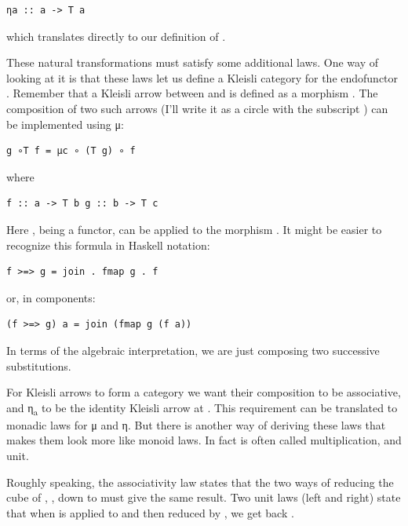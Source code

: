 \begin{verbatim}
ηa :: a -> T a
\end{verbatim}

which translates directly to our definition of .

These natural transformations must satisfy some additional laws. One way
of looking at it is that these laws let us define a Kleisli category for
the endofunctor . Remember that a Kleisli arrow between
 and  is defined as a morphism
. The composition of two such arrows
(I'll write it as a circle with the subscript ) can be
implemented using μ:

\begin{verbatim}
g ∘T f = μc ∘ (T g) ∘ f
\end{verbatim}

where

\begin{verbatim}
f :: a -> T b g :: b -> T c
\end{verbatim}

Here , being a functor, can be applied to the morphism
. It might be easier to recognize this formula in Haskell
notation:

\begin{verbatim}
f >=> g = join . fmap g . f
\end{verbatim}

or, in components:

\begin{verbatim}
(f >=> g) a = join (fmap g (f a))
\end{verbatim}

In terms of the algebraic interpretation, we are just composing two
successive substitutions.

For Kleisli arrows to form a category we want their composition to be
associative, and η\textsubscript{a} to be the identity Kleisli arrow at
. This requirement can be translated to monadic laws for μ and
η. But there is another way of deriving these laws that makes them look
more like monoid laws. In fact  is often called
multiplication, and  unit.

Roughly speaking, the associativity law states that the two ways of
reducing the cube of , , down to  must
give the same result. Two unit laws (left and right) state that when
 is applied to  and then reduced by , we
get back .

